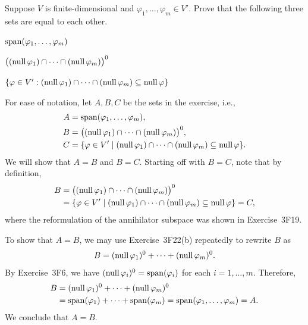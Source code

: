\begin{exercise}
Suppose $V$ is finite-dimensional and $\varphi_1,\dots,\varphi_m\in V'$. Prove
that the following three sets are equal to each other.
\begin{parts}
\item $\operatorname{span}(\varphi_1,\dots,\varphi_m)$
\item $\bigl((\operatorname{null}\varphi_1)\cap\cdots\cap(\operatorname{null}\varphi_m)\bigr)^0$
\item $\{\varphi\in V' : (\operatorname{null}\varphi_1)\cap\cdots\cap(\operatorname{null}\varphi_m)
  \subseteq\operatorname{null}\varphi\}$
\end{parts}
\end{exercise}
\begin{solution}
For ease of notation, let $A,B,C$ be the sets in the exercise, i.e.,
\begin{align*}
A &= \operatorname{span}(\varphi_1,\dots,\varphi_m),\\
B &= \bigl((\operatorname{null}\varphi_1)\cap\cdots\cap(\operatorname{null}\varphi_m)\bigr)^0,\\
C &= \{\varphi\in V' \mid (\operatorname{null}\varphi_1)\cap\cdots\cap(\operatorname{null}\varphi_m)
      \subseteq\operatorname{null}\varphi\}.
\end{align*}
We will show that $A=B$ and $B=C$. Starting off with $B=C$, note that by
definition,
\begin{align*}
B &= \bigl((\operatorname{null}\varphi_1)\cap\cdots\cap(\operatorname{null}\varphi_m)\bigr)^0\\
  &= \{\varphi\in V' \mid (\operatorname{null}\varphi_1)\cap\cdots\cap(\operatorname{null}\varphi_m)
     \subseteq\operatorname{null}\varphi\} = C,
\end{align*}
where the reformulation of the annihilator subspace was shown in
Exercise~3F19.

To show that $A=B$, we may use Exercise~3F22(b) repeatedly to rewrite $B$ as
\[ B = (\operatorname{null}\varphi_1)^0+\cdots+(\operatorname{null}\varphi_m)^0. \]
By Exercise~3F6, we have $(\operatorname{null}\varphi_i)^0=\operatorname{span}(\varphi_i)$ for each
$i=1,\dots,m$. Therefore,
\begin{align*}
B &= (\operatorname{null}\varphi_1)^0+\cdots+(\operatorname{null}\varphi_m)^0\\
  &= \operatorname{span}(\varphi_1)+\cdots+\operatorname{span}(\varphi_m) = \operatorname{span}(\varphi_1,\dots,\varphi_m)
   = A.
\end{align*}
We conclude that $A=B$.
\end{solution}


